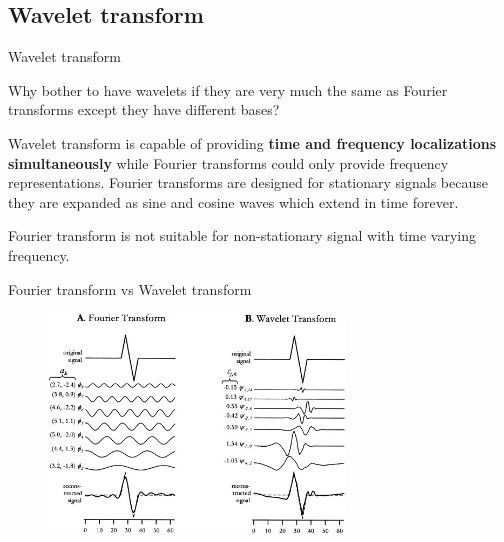 \documentclass{beamer}
\newcommand{\1}[1]{\mathds{1}\left(#1\right)}
\begin{document}
\subsection{Wavelet transform}
\begin{frame}{Wavelet transform}


\begin{block}{Why bother to have wavelets if they are very much the same as Fourier transforms
except they have different bases?}

Wavelet transform is capable of providing \textbf{time and frequency localizations
simultaneously} while Fourier transforms could only provide frequency representations.
Fourier transforms are designed for stationary signals because they
are expanded as sine and cosine waves which extend in time forever.
\end{block}

\begin{block}{}
	Fourier transform is not suitable for non-stationary signal with time varying frequency.
\end{block}
\end{frame}

\begin{frame}{Fourier transform vs Wavelet transform}
	\begin{figure}[p]
		\centering
		\includegraphics[width=0.7\textwidth]{FTvsWT.jpg}
	\end{figure}
\end{frame}
\end{document}
